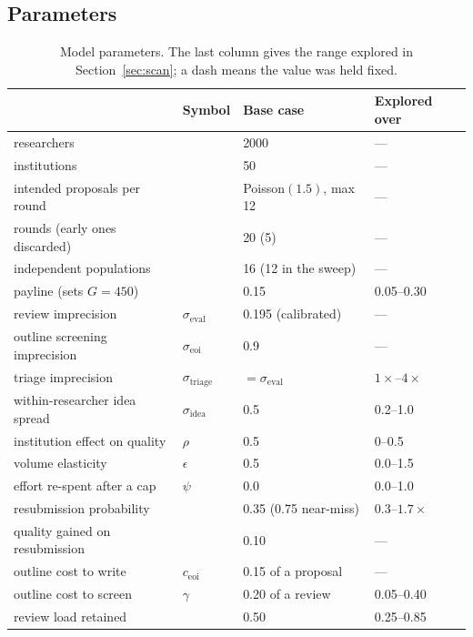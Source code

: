 \documentclass[11pt,a4paper]{article}
\begin{document}
\subsection{Parameters}

\begin{table}[!htbp]
\centering
\small
\caption{Model parameters. The last column gives the range explored in
Section~\ref{sec:scan}; a dash means the value was held fixed.}
\label{tab:params}
\begin{tabular}{llll}
\toprule
 & Symbol & Base case & Explored over \\
\midrule
researchers                       &                        & 2000 & --- \\
institutions                      &                        & 50 & --- \\
intended proposals per round      &                        & Poisson$(1.5)$, max 12 & --- \\
rounds (early ones discarded)     &                        & 20 (5) & --- \\
independent populations           &                        & 16 (12 in the sweep) & --- \\
payline (sets $G=450$)            &                        & 0.15 & 0.05--0.30 \\
review imprecision                & $\sigma_{\text{eval}}$ & 0.195 (calibrated) & --- \\
outline screening imprecision     & $\sigma_{\text{eoi}}$ & 0.9 & --- \\
triage imprecision                & $\sigma_{\text{triage}}$ & $=\sigma_{\text{eval}}$ & $1\times$--$4\times$ \\
within-researcher idea spread     & $\sigma_{\text{idea}}$ & 0.5 & 0.2--1.0 \\
institution effect on quality     & $\rho$                 & 0.5 & 0--0.5 \\
volume elasticity                 & $\epsilon$             & 0.5 & 0.0--1.5 \\
effort re-spent after a cap       & $\psi$                 & 0.0 & 0.0--1.0 \\
resubmission probability          &                        & 0.35 (0.75 near-miss) & $0.3$--$1.7\times$ \\
quality gained on resubmission    &                        & 0.10 & --- \\
outline cost to write             & $c_{\text{eoi}}$       & 0.15 of a proposal & --- \\
outline cost to screen            & $\gamma$               & 0.20 of a review & 0.05--0.40 \\
review load retained              &                        & 0.50 & 0.25--0.85 \\
\bottomrule
\end{tabular}
\end{table}
\end{document}
